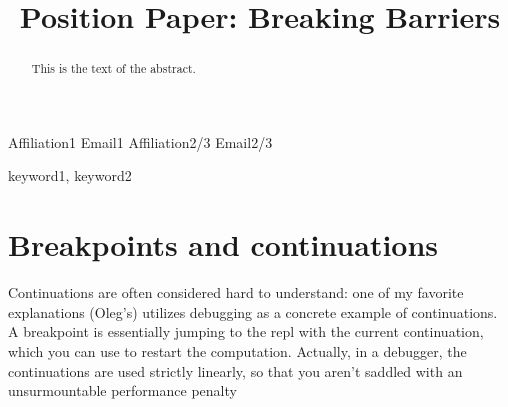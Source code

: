 \documentclass{sigplanconf}
\begin{document}
\setlength{\pdfpageheight}{\paperheight}
\setlength{\pdfpagewidth}{\paperwidth}






\title{Position Paper: Breaking Barriers}

           {Affiliation1}
           {Email1}
           {Affiliation2/3}
           {Email2/3}

\maketitle

\begin{abstract}
This is the text of the abstract.
\end{abstract}



\keywords
keyword1, keyword2





\section{Breakpoints and continuations}

Continuations are often considered hard to understand: one of my favorite explanations (Oleg's) utilizes debugging as a concrete example of continuations. A breakpoint is essentially jumping to the repl with the current continuation, which you can use to restart the computation.
	Actually, in a debugger, the continuations are used strictly linearly, so that you aren't saddled with an unsurmountable performance penalty
\end{document}
